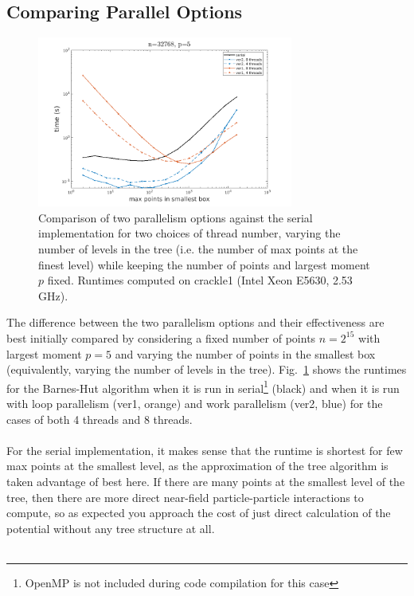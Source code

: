 \documentclass{article}
\begin{document}
\subsection{Comparing Parallel Options}
\begin{figure}
  \centering
  \includegraphics[width=0.75\textwidth]{./figures/varying_m_n32768_p5_4_8.png}
  \caption{Comparison of two parallelism options against the serial implementation for two choices of thread number, varying the number of levels in the tree (i.e. the number of max points at the finest level) while keeping the number of points and largest moment $p$ fixed. Runtimes computed on crackle1 (Intel Xeon E5630, 2.53 GHz).}
  \label{fig:varying_m}
\end{figure}
The difference between the two parallelism options and their effectiveness are best initially compared by considering a fixed number of points $n=2^{15}$ with largest moment $p=5$ and varying the number of points in the smallest box (equivalently, varying the number of levels in the tree). Fig.~\ref{fig:varying_m} shows the runtimes for the Barnes-Hut algorithm when it is run in serial\footnote{OpenMP is not included during code compilation for this case} (black) and when it is run with loop parallelism (ver1, orange) and work parallelism (ver2, blue) for the cases of both 4 threads and 8 threads.\\\\
For the serial implementation, it makes sense that the runtime is shortest for few max points at the smallest level, as the approximation of the tree algorithm is taken advantage of best here. If there are many points at the smallest level of the tree, then there are more direct near-field particle-particle interactions to compute, so as expected you approach the cost of just direct calculation of the potential without any tree structure at all.\\\\
\end{document}
